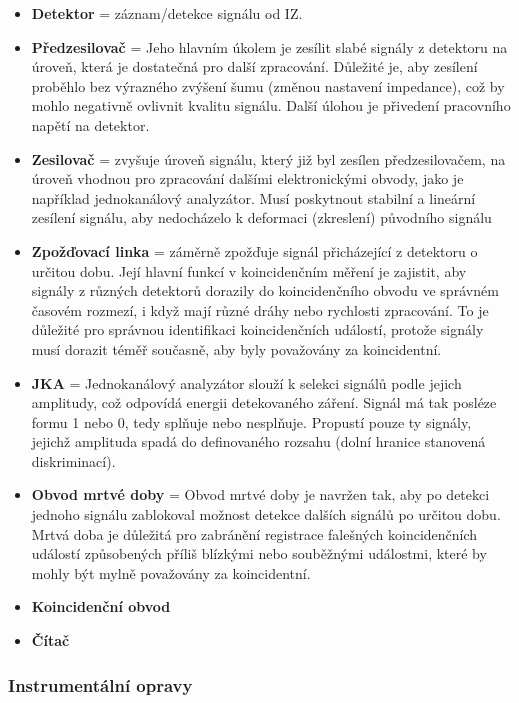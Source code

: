 \begin{itemize}
    \item \textbf{Detektor} = záznam/detekce signálu od IZ.
    \item \textbf{Předzesilovač} = Jeho hlavním úkolem je zesílit slabé signály z detektoru na úroveň, která je dostatečná pro další zpracování. Důležité je, aby zesílení proběhlo bez výrazného zvýšení šumu (změnou nastavení impedance), což by mohlo negativně ovlivnit kvalitu signálu. Další úlohou je přivedení pracovního napětí na detektor.
    \item \textbf{Zesilovač} = zvyšuje úroveň signálu, který již byl zesílen předzesilovačem, na úroveň vhodnou pro zpracování dalšími elektronickými obvody, jako je například jednokanálový analyzátor. Musí poskytnout stabilní a lineární zesílení signálu, aby nedocházelo k deformaci (zkreslení) původního signálu
    \item \textbf{Zpožďovací linka} = záměrně zpožďuje signál přicházející z detektoru o určitou dobu. Její hlavní funkcí v koincidenčním měření je zajistit, aby signály z různých detektorů dorazily do koincidenčního obvodu ve správném časovém rozmezí, i když mají různé dráhy nebo rychlosti zpracování. To je důležité pro správnou identifikaci koincidenčních událostí, protože signály musí dorazit téměř současně, aby byly považovány za koincidentní.
    \item \textbf{JKA} = Jednokanálový analyzátor slouží k selekci signálů podle jejich amplitudy, což odpovídá energii detekovaného záření. Signál má tak posléze formu 1 nebo 0, tedy splňuje nebo nesplňuje. Propustí pouze ty signály, jejichž amplituda spadá do definovaného rozsahu (dolní hranice stanovená diskriminací).
    \item \textbf{Obvod mrtvé doby} = Obvod mrtvé doby je navržen tak, aby po detekci jednoho signálu zablokoval možnost detekce dalších signálů po určitou dobu. Mrtvá doba je důležitá pro zabránění registrace falešných koincidenčních událostí způsobených příliš blízkými nebo souběžnými událostmi, které by mohly být mylně považovány za koincidentní.
    \item \textbf{Koincidenční obvod}
    \item \textbf{Čítač}
\end{itemize}

\subsubsection{Instrumentální opravy}


